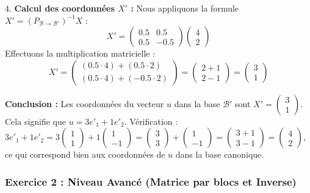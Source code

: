 \documentclass{report}
\begin{document}
4.  \textbf{Calcul des coordonnées $X'$ :}
    Nous appliquons la formule $X' = (P_{\mathcal{B} \to \mathcal{B}'})^{-1} X$ :
    $$X' = \begin{pmatrix} 0.5 & 0.5 \\ 0.5 & -0.5 \end{pmatrix} \begin{pmatrix} 4 \\ 2 \end{pmatrix}$$
    Effectuons la multiplication matricielle :
    $$X' = \begin{pmatrix} (0.5 \cdot 4) + (0.5 \cdot 2) \\ (0.5 \cdot 4) + (-0.5 \cdot 2) \end{pmatrix} = \begin{pmatrix} 2 + 1 \\ 2 - 1 \end{pmatrix} = \begin{pmatrix} 3 \\ 1 \end{pmatrix}$$

\textbf{Conclusion :}
Les coordonnées du vecteur $u$ dans la base $\mathcal{B}'$ sont $X' = \begin{pmatrix} 3 \\ 1 \end{pmatrix}$. Cela signifie que $u = 3e'_1 + 1e'_2$.
Vérification : $3e'_1 + 1e'_2 = 3 \begin{pmatrix} 1 \\ 1 \end{pmatrix} + 1 \begin{pmatrix} 1 \\ -1 \end{pmatrix} = \begin{pmatrix} 3 \\ 3 \end{pmatrix} + \begin{pmatrix} 1 \\ -1 \end{pmatrix} = \begin{pmatrix} 3+1 \\ 3-1 \end{pmatrix} = \begin{pmatrix} 4 \\ 2 \end{pmatrix}$, ce qui correspond bien aux coordonnées de $u$ dans la base canonique.

\subsubsection*{Exercice 2 : Niveau Avancé (Matrice par blocs et Inverse)}
\end{document}
